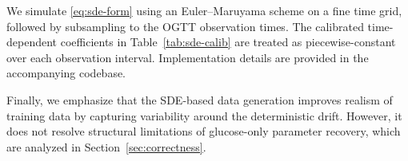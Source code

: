 We simulate \eqref{eq:sde-form} using an Euler--Maruyama scheme on a fine time grid, followed by subsampling to the OGTT observation times.
The calibrated time-dependent coefficients in Table~\ref{tab:sde-calib} are treated as piecewise-constant over each observation interval.
Implementation details are provided in the accompanying codebase.

Finally, we emphasize that the SDE-based data generation improves realism of training data by capturing variability around the deterministic drift.
However, it does not resolve structural limitations of glucose-only parameter recovery, which are analyzed in Section~\ref{sec:correctness}.